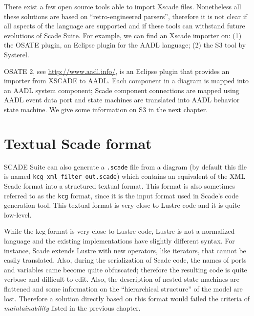 \documentclass{template/openetcs_report}
\begin{document}
There exist a few open source tools able to import Xscade
files. Nonetheless all these solutions are based on ``retro-engineered
parsers'', therefore it is not clear if all aspects of the language
are supported and if these tools can withstand future evolutions of
Scade Suite. For example, we can find an Xscade importer on: (1) the
OSATE plugin, an Eclipse plugin for the AADL language; (2) the S3 tool
by Systerel.  

OSATE 2, see \url{http://www.aadl.info/}, is an Eclipse plugin that
provides an importer from XSCADE to AADL. Each component in a diagram
is mapped into an AADL system component; Scade component connections
are mapped using AADL event data port and state machines are
translated into AADL behavior state machine. We give some information
on S3 in the next chapter.

\begin{center}
  \setlength{\fboxsep}{10pt}
\end{center}

\section{Textual Scade format}
\label{sec:textual-scade-format}

SCADE Suite can also generate a \verb+.scade+ file from a diagram (by
default this file is named \verb+kcg_xml_filter_out.scade+) which
contains an equivalent of the XML Scade format into a structured
textual format. This format is also sometimes referred to as the
\verb+kcg+ format, since it is the input format used in Scade's code
generation tool. This textual format is very close to Lustre code and
it is quite low-level.

While the kcg format is very close to Lustre code, Lustre is not a
normalized language and the existing implementations have slightly
different syntax. For instance, Scade extends Lustre with new
operators, like iterators, that cannot be easily translated. Also,
during the serialization of Scade code, the names of ports and
variables came become quite obfuscated; therefore the resulting code
is quite verbose and difficult to edit. Also, the description of
nested state machines are flattened and some information on the
``hierarchical structure'' of the model are lost. Therefore a solution
directly based on this format would failed the criteria of
\emph{maintainability} listed in the previous chapter.
\end{document}
